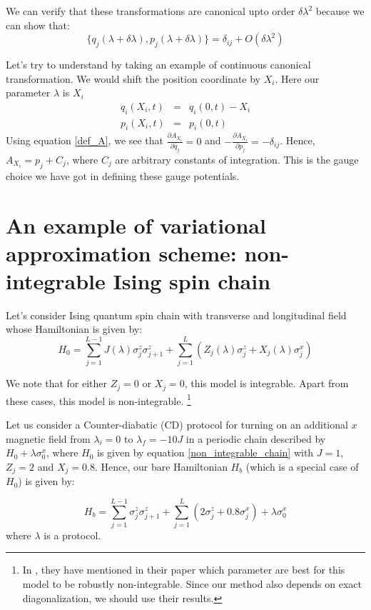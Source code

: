 \documentclass[11pt,a4paper]{article}
\begin{document}
We can verify that these transformations are canonical upto order $\delta \lambda ^2$ because we can show that:
\begin{equation}
\{q_j(\lambda + \delta \lambda), p_j(\lambda + \delta \lambda)\} = \delta_{ij} + O(\delta \lambda ^2)
\end{equation}

Let's try to understand by taking an example of continuous canonical transformation. We would shift the position coordinate by $X_i$. Here our parameter $\lambda$ is $X_i$
\begin{eqnarray}
 q_i(X_i,t) &=& q_i(0,t) - X_i \\
p_i(X_i,t)&=& p_i(0,t)
\end{eqnarray}
Using equation \ref{def_A}, we see that $\frac{\partial A_{X_i}}{\partial q_j}=0$ and $-\frac{\partial A_{X_i}}{\partial p_j}=-\delta_{ij}$. Hence, $A_{X_i}=p_j + C_j$, where $C_j$ are arbitrary constants of integration. This is the gauge choice we have got in defining these gauge potentials. 

\section{An example of variational approximation scheme: non-integrable Ising spin chain}
Let's consider Ising quantum spin chain with transverse and longitudinal field whose Hamiltonian is given by:
\begin{equation}
H_0=\sum_{j=1}^{L-1} J(\lambda) \sigma_j^z \sigma_{j+1}^z + \sum_{j=1}^{L}  (Z_j (\lambda) \sigma_j^z +X_j (\lambda) \sigma_j^x)
\label{non_integrable_chain}
\end{equation}

We note that for either $Z_j=0$ or $X_j=0$, this model is integrable. Apart from these cases, this model is non-integrable. \footnote{In \cite{kim2013ballistic}, they have mentioned in their paper which parameter are best for this model to be robustly non-integrable. Since our method also depends on exact diagonalization, we should use their results.}

Let us consider a Counter-diabatic (CD) protocol for turning on an additional $x$ magnetic field from $\lambda_i=0$ to $\lambda_f=-10 J$ in a periodic chain described by $H_0 + \lambda \sigma_0^x$, where $H_0$ is given by equation \ref{non_integrable_chain} with $J=1$, $Z_j=2$ and $X_j=0.8$. Hence, our bare Hamiltonian $H_b$ (which is a special case of $H_0$) is given by:

\begin{equation}
H_b=\sum_{j=1}^{L-1}  \sigma_j^z \sigma_{j+1}^z + \sum_{j=1}^{L}   ( 2 \sigma_j^z + 0.8 \sigma_j^x) +\lambda \sigma_0^x
\label{non_integrable_chain_bare}
\end{equation}
where $\lambda$ is a protocol. 
\end{document}
